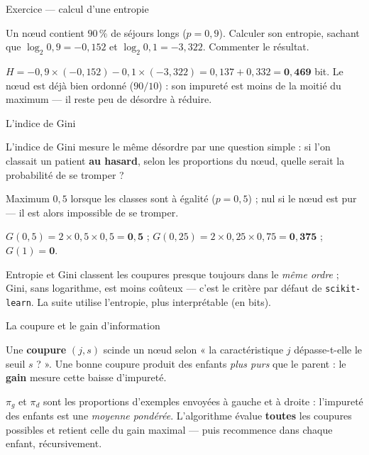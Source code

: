\documentclass[aspectratio=169,11pt]{beamer}
\begin{document}
\begin{frame}{Exercice — calcul d'une entropie}
\begin{ucadrec}[Énoncé]
{\small Un nœud contient $90\,\%$ de séjours longs ($p = 0{,}9$). Calculer son entropie, sachant que $\log_2 0{,}9 = -0{,}152$ et $\log_2 0{,}1 = -3{,}322$. Commenter le résultat.}
\end{ucadrec}
\pause
\begin{ucadex}[Correction]
{\small $H = -0{,}9\times(-0{,}152) - 0{,}1\times(-3{,}322) = 0{,}137 + 0{,}332 = \mathbf{0{,}469}$ bit. Le nœud est déjà bien ordonné ($90/10$) : son impureté est moins de la moitié du maximum — il reste peu de désordre à réduire.}
\end{ucadex}
\end{frame}

\begin{frame}{L'indice de Gini}
\begin{ucaddef}
{\small L'indice de Gini mesure le même désordre par une question simple : si l'on classait un patient \textbf{au hasard}, selon les proportions du nœud, quelle serait la probabilité de se tromper ?}
\end{ucaddef}
{\small Maximum $0{,}5$ lorsque les classes sont à égalité ($p=0{,}5$) ; nul si le nœud est pur — il est alors impossible de se tromper.}
\begin{ucadex}
{\small $G(0{,}5) = 2\times 0{,}5\times 0{,}5 = \mathbf{0{,}5}$ ; \quad $G(0{,}25) = 2\times 0{,}25\times 0{,}75 = \mathbf{0{,}375}$ ; \quad $G(1) = \mathbf{0}$.}
\end{ucadex}
{\small Entropie et Gini classent les coupures presque toujours dans le \emph{même ordre} ; Gini, sans logarithme, est moins coûteux — c'est le critère par défaut de \texttt{scikit-learn}. La suite utilise l'entropie, plus interprétable (en bits).}
\end{frame}

\begin{frame}{La coupure et le gain d'information}
\begin{ucaddef}
{\small Une \textbf{coupure} $(j,s)$ scinde un nœud selon « la caractéristique $j$ dépasse-t-elle le seuil $s$ ? ». Une bonne coupure produit des enfants \emph{plus purs} que le parent : le \textbf{gain} mesure cette baisse d'impureté.}
\end{ucaddef}
{\small $\pi_g$ et $\pi_d$ sont les proportions d'exemples envoyées à gauche et à droite : l'impureté des enfants est une \emph{moyenne pondérée}. L'algorithme évalue \textbf{toutes} les coupures possibles et retient celle du gain maximal — puis recommence dans chaque enfant, récursivement.}
\end{frame}
\end{document}
